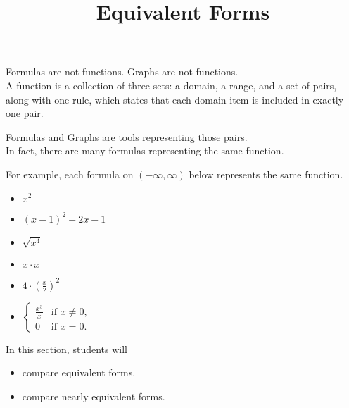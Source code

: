 \documentclass{ximera}
\title{Equivalent Forms}
\begin{document}
\begin{abstract}
\end{abstract}
\maketitle




Formulas are not functions.  Graphs are not functions. \\


A function is a collection of three sets: a domain, a range, and a set of pairs, along with one rule, which states that each domain item is included in exactly one pair.

Formulas and Graphs are tools representing those pairs.  \\


In fact, there are many formulas representing the same function.

For example, each formula on $(-\infty, \infty)$ below represents the same function.


\begin{itemize}
\item $x^2$
\item $(x - 1)^2 + 2 x - 1$
\item $\sqrt{x^4}$
\item $ x \cdot x$
\item $ 4 \cdot \left( \frac{x}{2} \right)^2$
\item $\begin{cases}
  \frac{x^3}{x} &\text{if $x \ne 0$,}\\
  0 &\text{if $x = 0$}.
\end{cases}$
\end{itemize}












\begin{sectionOutcomes}
In this section, students will 

\begin{itemize}
\item compare equivalent forms.
\item compare nearly equivalent forms.
\end{itemize}
\end{sectionOutcomes}
\end{document}
